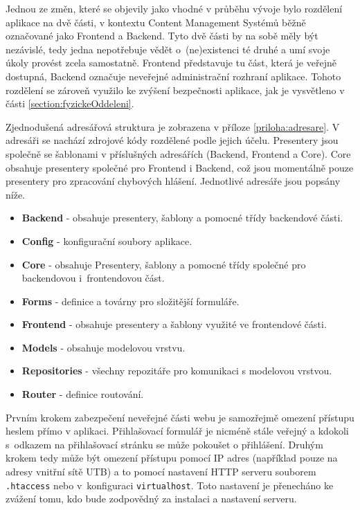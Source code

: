 Jednou ze změn, které se objevily jako vhodné v průběhu vývoje bylo rozdělení aplikace na dvě části, v kontextu Content Management Systémů běžně označované jako Frontend a Backend. Tyto dvě části by na sobě měly být nezávislé, tedy jedna nepotřebuje vědět o~(ne)existenci té druhé a umí svoje úkoly provést zcela samostatně. Frontend představuje tu část, která je veřejně dostupná, Backend označuje neveřejné administrační rozhraní aplikace. Tohoto rozdělení se zároveň využilo ke zvýšení bezpečnosti aplikace, jak je vysvětleno v části \ref{section:fyzickeOddeleni}.

\bigskip

Zjednodušená adresářová struktura je zobrazena v příloze \ref{priloha:adresare}. V adresáři  se nachází zdrojové kódy rozdělené podle jejich účelu. Presentery jsou společně se šablonami v příslušných adresářích (Backend, Frontend a Core). Core obsahuje presentery společné pro Frontend i Backend, což jsou momentálně pouze presentery pro zpracování chybových hlášení. Jednotlivé adresáře jsou popsány níže.

\clearpage

\begin{itemize}
	\item  \textbf{Backend} - obsahuje presentery, šablony a pomocné třídy backendové části.
	\item \textbf{Config} - konfigurační soubory aplikace.
	\item \textbf{Core} - obsahuje Presentery, šablony a pomocné třídy společné pro backendovou i~frontendovou část.
	\item \textbf{Forms} - definice a továrny pro složitější formuláře.
	\item \textbf{Frontend} - obsahuje presentery a šablony využité ve frontendové části.
	\item \textbf{Models} - obsahuje modelovou vrstvu.
	\item \textbf{Repositories} - všechny repozitáře pro komunikaci s modelovou vrstvou.
	\item \textbf{Router} - definice routování.
\end{itemize}

 \label{section:fyzickeOddeleni}
Prvním krokem zabezpečení neveřejné části webu je samozřejmě omezení přístupu heslem přímo v aplikaci. Přihlašovací formulář je nicméně stále veřejný a kdokoli s~odkazem na přihlašovací stránku se může pokoušet o přihlášení. Druhým krokem tedy může být omezení přístupu pomocí IP adres (například pouze na adresy vnitřní sítě UTB) a to pomocí nastavení HTTP serveru souborem \texttt{.htaccess} nebo v~konfiguraci \texttt{virtualhost}. Toto nastavení je přenecháno ke zvážení tomu, kdo bude zodpovědný za instalaci a nastavení serveru.

